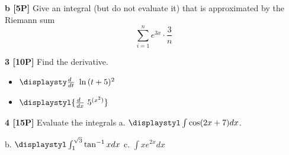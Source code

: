 \documentclass[12pt]{article}
\begin{document}

{\bf b [5P]} Give an integral 
(but do not evaluate it) that is approximated by the Riemann sum
\[
\sum_{i=1}^n e^{3x}\cdot \frac{3}{n}
\]

\vspace{3.5in}





{\bf 3 [10P]} Find the derivative. 
\begin{itemize}
\item[a.] 
${\displaysty \frac{d\ }{dt} ~ \ln {(t+5)^2}}$
\item[b.]
$\displaystyl{ \frac{d\ }{dx} ~ 5^{( x^2)} }$
\end{itemize}

\newpage
{\bf 4 [15P]} Evaluate the integrals \quad
a. ${\displaystyl \int \cos (2 x+7) dx}$.


b. ${\displaystyl \int_{1}^{\sqrt{3}} \tan^{-1} x dx}$
\qquad c.  ${\displaystyle \int x e^{2x} dx }$

\end{document}
